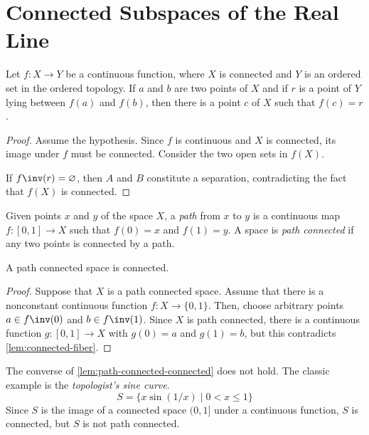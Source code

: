 \documentclass{amsart}
\begin{document}
\section{Connected Subspaces of the Real Line}
\label{sec:connected-subspaces-of-the-real-line}

\begin{thm}
  Let $f : X \to Y$ be a continuous function, where $X$ is connected and $Y$ is an ordered set in the ordered topology.
  If $a$ and $b$ are two points of $X$ and if $r$ is a point of $Y$ lying between $f(a)$ and $f(b)$, then there is a point $c$ of $X$ such that $f(c) = r$.
\end{thm}
\begin{proof}
  Assume the hypothesis.
  Since $f$ is continuous and $X$ is connected, its image under $f$ must be connected.
  Consider the two open sets in $f(X)$.
  If $f\inv(r) = \varnothing$, then $A$ and $B$ constitute a separation, contradicting the fact that $f(X)$ is connected.
\end{proof}

\begin{defn}
  Given points $x$ and $y$ of the space $X$, a \emph{path} from $x$ to $y$ is a continuous map $f : [0,1] \to X$ such that $f(0) = x$ and $f(1) = y$.
  A space is \emph{path connected} if any two points is connected by a path.
\end{defn}

\begin{lem}\label{lem:path-connected-connected}
  A path connected space is connected.
\end{lem}
\begin{proof}
  Suppose that $X$ is a path connected space.
  Assume that there is a nonconstant continuous function $f : X \to \{0, 1\}$.
  Then, choose arbitrary points $a \in f\inv(0)$ and $b \in f\inv(1)$.
  Since $X$ is path connected, there is a continuous function $g : [0,1] \to X$ with $g(0) = a$ and $g(1) = b$, but this contradicts \cref{lem:connected-fiber}.
\end{proof}

The converse of \cref{lem:path-connected-connected} does not hold.
The classic example is the \emph{topologist's sine curve}.
\[
  S = \{x\sin(1/x) \mid 0 < x \leq 1\}
\]
Since $S$ is the image of a connected space $(0,1]$ under a continuous function, $S$ is connected, but $S$ is not path connected.
\end{document}
